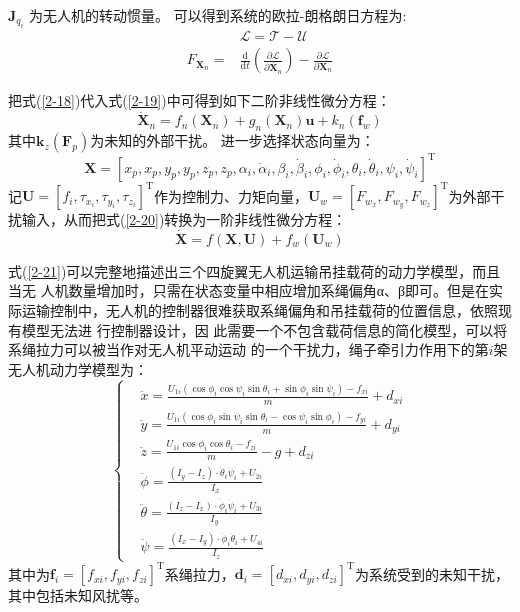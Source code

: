 \documentclass[lang=chs, degree=master, blindreview=false, winfonts=true]{yanputhesis}
\begin{document}
$\boldsymbol{J}_{q_{i}}$ 为无人机的转动惯量。
可以得到系统的欧拉-朗格朗日方程为:
\begin{equation}
\begin{aligned}
	&\mathcal{L}=\mathcal{T}-\mathcal{U} \\
	{F}_{\boldsymbol{X}_n}=&\frac{\mathrm{d}}{\mathrm{d}t}\left(\frac{\partial\mathcal{L}}{\partial\dot{\boldsymbol{X}_n}}\right)-\frac{\partial\mathcal{L}}{\partial\boldsymbol{X}_n}
\end{aligned}
\label{2-19}
\end{equation}


把式(\ref{2-18})代入式(\ref{2-19})中可得到如下二阶非线性微分方程：
\begin{equation}	
	\dot{\bm X}_n= f_n(\bm X_n)+ g_n(\bm X_n)\bm u+ k_{n}\left(\bm f_{w}\right)
	\label{2-20}
\end{equation}
其中$\bm k_{z}\left(\bm F_{p}\right)$为未知的外部干扰。
进一步选择状态向量为：$$\bm X=\left[x_{p},x_{p},y_{p},y_{p},z_{p},z_{p},\alpha_{i},\dot{\alpha}_{i},\beta_{i},\dot{\beta}_{i},\phi_{i},\dot{\phi}_{i},\theta_{i},\dot{\theta}_{i},\psi_{i},\dot{\psi}_{i}\right]^\mathrm{T}$$
记$\bm{U}=\left[f_i,\tau_{x_i},\tau_{y_i},\tau_{z_i}\right]^\mathrm{T}$作为控制力、力矩向量，${\boldsymbol{U}}_{w}=\left[F_{w_x},F_{w_y},F_{w_z}\right]^\mathrm{T}$为外部干扰输入，从而把式(\ref{2-20})转换为一阶非线性微分方程：
\begin{equation}
	\dot{\boldsymbol{X}}= f\left(\boldsymbol{X},\boldsymbol{U}\right)+ f_w\left(\boldsymbol{U}_w\right)
	\label{2-21}
\end{equation}

式(\ref{2-21})可以完整地描述出三个四旋翼无人机运输吊挂载荷的动力学模型，而且当无
人机数量增加时，只需在状态变量中相应增加系绳偏角α、β即可。但是在实际运输控制中，无人机的控制器很难获取系绳偏角和吊挂载荷的位置信息，依照现有模型无法进
行控制器设计，因
此需要一个不包含载荷信息的简化模型，可以将系绳拉力可以被当作对无人机平动运动
的一个干扰力，绳子牵引力作用下的第$i$架无人机动力学模型为： 
\begin{equation}
	\left\{
	\begin{aligned}
		&\ddot{x}=\frac{U_{1i}\left(\cos\phi_i\cos\psi_i\sin\theta_i+\sin\phi_i\sin\psi_i\right)-f_{xi}}{m}+d_{xi}\\
		&\ddot{y}=\frac{U_{1i}\left(\cos\phi_i\sin\psi_i\sin\theta_i-\cos\psi_i\sin\phi_i\right)-f_{yi}}{m}+d_{yi}\\
		&\ddot{z}=\frac{U_{1i}\cos\phi_i\cos\theta_i-f_{zi}}{m}-g+d_{zi}\\
		&\ddot{\phi}=\frac{(I_{y}-I_{z})\cdot \dot{\theta}_i\dot{\psi}_i+U_{2i}}{I_{x}}\\
		&\ddot{\theta}=\frac{(I_{z}-I_{x})\cdot \dot{\phi}_i\dot{\psi}_i+U_{3i}}{I_{y}}\\
		&\ddot{\psi}=\frac{(I_{x}-I_{y})\cdot \dot{\phi}_i\dot{\theta}_i+U_{4i}}{I_{z}}\end{aligned}
	\right.
	\label{2-22}
\end{equation}
其中为$\boldsymbol{f}_{i}=
\left[f_{xi} , f_{yi} , f_{zi}\right]^\mathrm{T}$系绳拉力，$\bm d_i=\left[d_{xi},d_{yi},d_{zi}\right]^\mathrm{T}$为系统受到的未知干扰，其中包括未知风扰等。 
\end{document}
